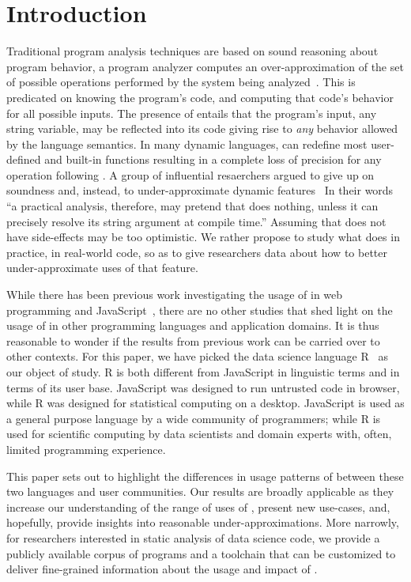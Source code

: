 \documentclass[conference]{IEEEtran}
\begin{document}
\section{Introduction}

Traditional program analysis techniques are based on sound reasoning about
program behavior, a program analyzer computes an over-approximation of the
set of possible operations performed by the system being
analyzed~\cite{cc77}.  This is predicated on knowing the program's code, and
computing that code's behavior for all possible inputs. The presence of
\eval entails that the program's input, any string variable, may be
reflected into its code giving rise to \emph{any} behavior allowed by the
language semantics. In many dynamic languages, \eval can redefine most
user-defined and built-in functions resulting in a complete loss of
precision for any operation following \eval. A group of influential
resaerchers argued to give up on soundness and, instead, to
under-approximate dynamic features~\cite{soundy} In their words ``a
practical analysis, therefore, may pretend that \eval does nothing, unless
it can precisely resolve its string argument at compile time.''  Assuming
that \eval does not have side-effects may be too optimistic. We rather
propose to study what \eval does in practice, in real-world code, so as to
give researchers data about how to better under-approximate uses of that
feature.

While there has been previous work investigating the usage of \eval in web
programming and JavaScript~\cite{ecoop11}, there are no other studies that
shed light on the usage of \eval in other programming languages and
application domains.  It is thus reasonable to wonder if the results from
previous work can be carried over to other contexts. For this paper, we have
picked the data science language R~\cite{r} as our object of study. R is
both different from JavaScript in linguistic terms and in terms of its user
base. JavaScript was designed to run untrusted code in browser, while R was
designed for statistical computing on a desktop. JavaScript is used as a
general purpose language by a wide community of programmers; while R is used
for scientific computing by data scientists and domain experts with, often,
limited programming experience.

This paper sets out to highlight the differences in usage patterns of \eval
between these two languages and user communities. Our results are broadly
applicable as they increase our understanding of the range of uses of \eval,
present new use-cases, and, hopefully, provide insights into reasonable
under-approximations. More narrowly, for researchers interested in static
analysis of data science code, we provide a publicly available corpus of
programs and a toolchain that can be customized to deliver fine-grained
information about the usage and impact of \eval.
\end{document}
